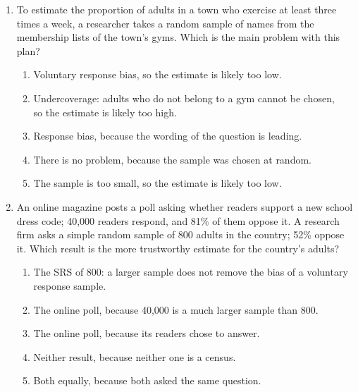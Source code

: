\documentclass[12pt]{article}
\begin{document}
\begin{enumerate}[leftmargin=1.9em, itemsep=0.13in]
  \boxguard[13]
  \item To estimate the proportion of adults in a town who exercise at least three times a
        week, a researcher takes a random sample of names from the membership lists of the
        town's gyms. Which is the main problem with this plan?
        \begin{enumerate}[label=\textbf{(\Alph*)}, leftmargin=2.2em, itemsep=2pt]
          \item Voluntary response bias, so the estimate is likely too low.
          \item Undercoverage: adults who do not belong to a gym cannot be chosen,\\
                so the estimate is likely too high.
          \item Response bias, because the wording of the question is leading.
          \item There is no problem, because the sample was chosen at random.
          \item The sample is too small, so the estimate is likely too low.\hfill{}\rule[-0.2in]{0pt}{0.48in}
        \end{enumerate}

  \boxguard[14]
  \item An online magazine posts a poll asking whether readers support a new school dress
        code; 40{,}000 readers respond, and 81\% of them oppose it. A research firm asks a
        simple random sample of 800 adults in the country; 52\% oppose it. Which result is the
        more trustworthy estimate for the country's adults?
        \begin{enumerate}[label=\textbf{(\Alph*)}, leftmargin=2.2em, itemsep=2pt]
          \item The SRS of 800: a larger sample does not remove the bias of a voluntary\\
                response sample.
          \item The online poll, because 40{,}000 is a much larger sample than 800.
          \item The online poll, because its readers chose to answer.
          \item Neither result, because neither one is a census.
          \item Both equally, because both asked the same question.\hfill{}\rule[-0.2in]{0pt}{0.48in}
        \end{enumerate}


\end{enumerate}
\end{document}
